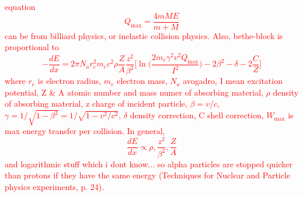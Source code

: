 \textcolor{red}{equation $$Q_\text{max}=\frac{4mM E}{m+M}$$ can be from billiard physics, or inelastic collision physics. Also, bethe-block is proportional to 
\begin{equation}
    -\frac{dE}{dx}=2\pi N_a r_e^2 m_e c^2\rho \frac{Z}{A}\frac{z^2}{\beta^2}\Big[\ln \Big( \frac{2m_e \gamma^2 v^2 Q_\text{max}}{I^2} \Big)-2\beta^2 -\delta - 2 \frac{C}{Z}\Big]
\end{equation}
where $r_e$ is electron radius, $m_e$ electron mass, $N_a$ avogadro, I mean excitation potential, Z \& A atomic number and mass numer of absorbing material, $\rho$ density of absorbing material, z charge of incident particle, $\beta=v/c$, $\gamma=1/\sqrt{1-\beta^2}= 1/\sqrt{1-v^2/c^2}$, $\delta$ density correction, C shell correction, $W_\text{max}$ is max energy transfer per collision. In general, $$\frac{dE}{dx}\propto \rho,\frac{z^2}{\beta^2},\frac{Z}{A}$$ and logarithmic stuff which i dont know... so alpha particles are stopped quicker than protons if they have the same energy (Techniques for Nuclear and Particle physics experiments, p. 24). }
